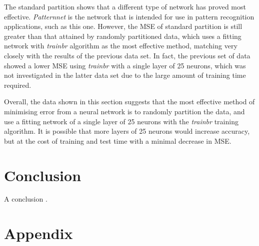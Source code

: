 \documentclass[a4paper, 10pt, conference]{ieeeconf}
\begin{document}
The standard partition shows that a different type of network has proved most effective. \textit{Patternnet} is the network that is intended for use in pattern recognition applications, such as this one. However, the MSE of standard partition is still greater than that attained by randomly partitioned data, which uses a fitting network with \textit{trainbr} algorithm as the most effective method, matching very closely with the results of the previous data set. In fact, the previous set of data showed a lower MSE using \textit{trainbr} with a single layer of 25 neurons, which was not investigated in the latter data set due to the large amount of training time required.

Overall, the data shown in this section suggests that the most effective method of minimising error from a neural network is to randomly partition the data, and use a fitting network of a single layer of 25 neurons with the \textit{trainbr} training algorithm. It is possible that more layers of 25 neurons would increase accuracy, but at the cost of training and test time with a minimal decrease in MSE.


\section{Conclusion}

A conclusion \cite{pca}.




\onecolumn
\section*{Appendix}
\end{document}
